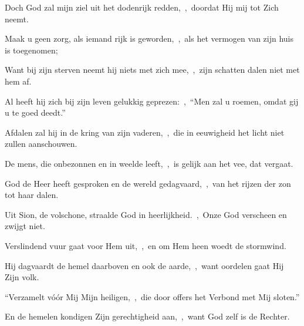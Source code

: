 \documentclass[12pt,twoside,a5paper]{article}
\begin{document}

\begin{halfparskip}
  Doch God zal mijn ziel uit het dodenrijk redden,~\sep\ doordat Hij mij tot Zich neemt.

  Maak u geen zorg, als iemand rijk is geworden,~\sep\ als het vermogen van zijn huis is toegenomen;

  Want bij zijn sterven neemt hij niets met zich mee,~\sep\ zijn schatten dalen niet met hem af.

  Al heeft hij zich bij zijn leven gelukkig geprezen:~\sep\ ``Men zal u roemen, omdat gij u te goed deedt.''

  Afdalen zal hij in de kring van zijn vaderen,~\sep\ die in eeuwigheid het licht niet zullen aanschouwen.

  De mens, die onbezonnen en in weelde leeft,~\sep\ is gelijk aan het vee, dat vergaat.
\end{halfparskip}







\begin{halfparskip}
  God de Heer heeft gesproken en de wereld gedagvaard,~\sep\ van het rijzen der zon tot haar dalen.


  Uit Sion, de volschone, straalde God in heerlijkheid.~\sep\ Onze God verscheen en zwijgt niet.

  Verslindend vuur gaat voor Hem uit,~\sep\ en om Hem heen woedt de stormwind.

  Hij dagvaardt de hemel daarboven en ook de aarde,~\sep\ want oordelen gaat Hij Zijn volk.

  ``Verzamelt vóór Mij Mijn heiligen,~\sep\ die door offers het Verbond met Mij sloten.''

  En de hemelen kondigen Zijn gerechtigheid aan,~\sep\ want God zelf is de Rechter.
\end{halfparskip}
\end{document}
